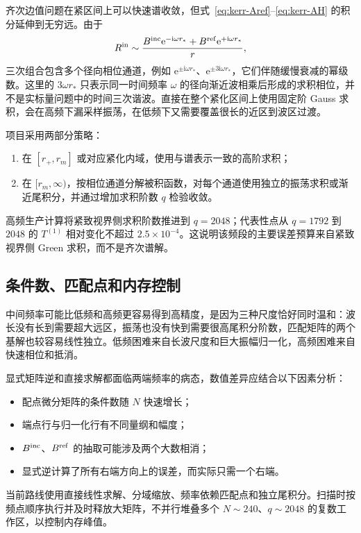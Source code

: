 \documentclass[UTF8,fontset=fandol,12pt,a4paper,oneside,openany]{ctexrep}
\newcommand{\ii}{\mathrm i}
\newcommand{\ee}{\mathrm e}
\newcommand{\Bin}{B^{\rm inc}}
\newcommand{\Bref}{B^{\rm ref}}
\begin{document}
齐次边值问题在紧区间上可以快速谱收敛，但式~\eqref{eq:kerr-Aref}--\eqref{eq:kerr-AH} 的积分延伸到无穷远。由于
\begin{equation}
R^{\rm in}\sim\frac{\Bin\ee^{-\ii\omega r_*}+\Bref\ee^{+\ii\omega r_*}}{r},
\end{equation}
三次组合包含多个径向相位通道，例如 $\ee^{\pm\ii\omega r_*}$、$\ee^{\pm3\ii\omega r_*}$，它们伴随缓慢衰减的幂级数。这里的 $3\omega r_*$ 只表示同一时间频率 $\omega$ 的径向渐近波相乘后形成的求积相位，并不是实标量问题中的时间三次谐波。直接在整个紧化区间上使用固定阶 Gauss 求积，会在高频下漏采样振荡，在低频下又需要覆盖很长的近区到波区过渡。

项目采用两部分策略：
\begin{enumerate}
\item 在 $[r_+,\allowbreak r_m]$ 或对应紧化内域，使用与谱表示一致的高阶求积；
\item 在 $[r_m,\allowbreak \infty)$，按相位通道分解被积函数，对每个通道使用独立的振荡求积或渐近尾积分，并通过增加求积阶数 $q$ 检验收敛。
\end{enumerate}
高频生产计算将紧致视界侧求积阶数推进到 $q=2048$；代表性点从 $q=1792$ 到 $2048$ 的 $T^{(1)}$ 相对变化不超过 $2.5\times10^{-4}$。这说明该频段的主要误差预算来自紧致视界侧 Green 求积，而不是齐次谱解。

\subsection{条件数、匹配点和内存控制}

中间频率可能比低频和高频更容易得到高精度，是因为三种尺度恰好同时温和：波长没有长到需要超大远区，振荡也没有快到需要很高尾积分阶数，匹配矩阵的两个基解也较容易线性独立。低频困难来自长波尺度和巨大振幅归一化，高频困难来自快速相位和抵消。

显式矩阵逆和直接求解都面临两端频率的病态，数值差异应结合以下因素分析：
\begin{itemize}
\item 配点微分矩阵的条件数随 $N$ 快速增长；
\item 端点行与归一化行有不同量纲和幅度；
\item $\Bin$、$\Bref$ 的抽取可能涉及两个大数相消；
\item 显式逆计算了所有右端方向上的误差，而实际只需一个右端。
\end{itemize}
当前路线使用直接线性求解、分域缩放、频率依赖匹配点和独立尾积分。扫描时按频点顺序执行并及时释放大矩阵，不并行堆叠多个 $N\sim240$、$q\sim2048$ 的复数工作区，以控制内存峰值。
\end{document}
